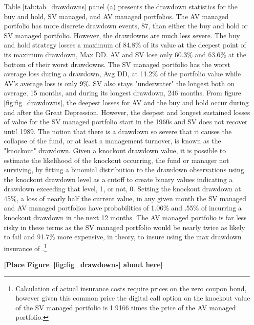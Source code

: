 Table \ref{tab:tab_drawdowns} panel (a) presents the drawdown statistics for the buy and hold, SV managed, and AV managed portfolios. The AV managed portfolio has more discrete drawdown events, 87, than either the buy and hold or SV managed portfolio. However, the drawdowns are much less severe. The buy and hold strategy losses a maximum of 84.8\% of its value at the deepest point of its maximum drawdown, Max DD. AV and SV lose only 60.3\% and 63.6\% at the bottom of their worst drawdowns. The SV managed portfolio has the worst average loss during a drawdown, Avg DD, at 11.2\% of the portfolio value while AV's average loss is only 9\%. SV also stays "underwater" the longest both on average, 15 months, and during its longest drawdown, 246 months. From figure \ref{fig:fig_drawdowns}, the deepest losses for AV and the buy and hold occur during and after the Great Depression. However, the deepest and longest sustained losses of value for the SV managed portfolio start in the 1960s and SV does not recover until 1989. The notion that there is a drawdown so severe that it causes the collapse of the fund, or at least a management turnover, is known as the "knockout" drawdown. \citep{pav_notes_nodate} Given a knockout drawdown value, it is possible to estimate the likelihood of the knockout occurring, the fund or manager not surviving, by fitting a binomial distribution to the drawdown observations using the knockout drawdown level as a cutoff to create binary values indicating a drawdown exceeding that level, 1, or not, 0. \citep{pav_notes_nodate} Setting the knockout drawdown at 45\%, a loss of nearly half the current value, in any given month the SV managed and AV managed portfolios have probabilities of 1.06\% and .55\% of incurring a knockout drawdown in the next 12 months. The AV managed portfolio is far less risky in these terms as the SV managed portfolio would be nearly twice as likely to fail and 91.7\% more expensive, in theory, to insure using the max drawdown insurance of \citet{carr_maximum_2011}.\footnote{Calculation of actual insurance costs require prices on the zero coupon bond, however given this common price the digital call option on the knockout value of the SV managed portfolio is 1.9166 times the price of the AV managed portfolio.}

\bigskip
\centerline{\bf [Place Figure~\ref{fig:fig_drawdowns} about here]}
\bigskip

